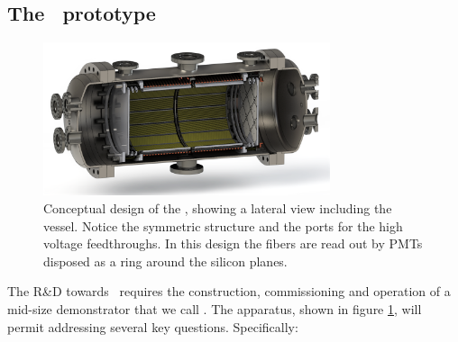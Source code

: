 \subsection{The \HDEMO\ prototype}

\begin{figure}
  \begin{center}
    \includegraphics[width=0.75\textwidth]{img2/nhd_vessel_render1.png}
    \caption{Conceptual design of the \HDEMO,  showing a lateral view including the vessel. Notice the symmetric structure and the ports for
    the high voltage feedthroughs. In this design the fibers are read out by PMTs disposed as a ring around the silicon planes.} 
    \label{fig.hdemo}
  \end{center}
\end{figure}




The R\&D towards \NHD\ requires the construction, commissioning and operation of a mid-size demonstrator that we call \HDEMO. The apparatus, shown in figure \ref{fig.hdemo}, will permit addressing several key questions. Specifically:



